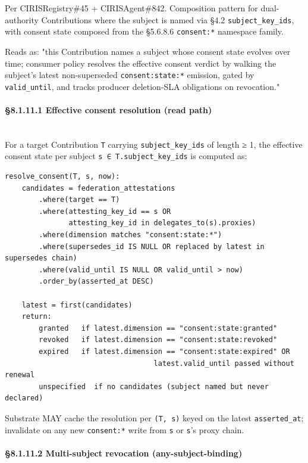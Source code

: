 \documentclass[11pt]{article}
\begin{document}
Per CIRISRegistry\#45 + CIRISAgent\#842. Composition pattern for dual-authority Contributions where the subject is named via §4.2 \texttt{subject\_key\_ids}, with consent state composed from the §5.6.8.6 \texttt{consent:*} namespace family.


Reads as: "this Contribution names a subject whose consent state evolves over time; consumer policy resolves the effective consent verdict by walking the subject's latest non-superseded \texttt{consent:state:*} emission, gated by \texttt{valid\_until}, and tracks producer deletion-SLA obligations on revocation."


\paragraph{§8.1.11.1 Effective consent resolution (read path)}\mbox{}\\


For a target Contribution \texttt{T} carrying \texttt{subject\_key\_ids} of length ≥ 1, the effective consent state per subject \texttt{s ∈ T.subject\_key\_ids} is computed as:


\begin{lstlisting}
resolve_consent(T, s, now):
    candidates = federation_attestations
        .where(target == T)
        .where(attesting_key_id == s OR
               attesting_key_id in delegates_to(s).proxies)
        .where(dimension matches "consent:state:*")
        .where(supersedes_id IS NULL OR replaced by latest in supersedes chain)
        .where(valid_until IS NULL OR valid_until > now)
        .order_by(asserted_at DESC)

    latest = first(candidates)
    return:
        granted   if latest.dimension == "consent:state:granted"
        revoked   if latest.dimension == "consent:state:revoked"
        expired   if latest.dimension == "consent:state:expired" OR
                                   latest.valid_until passed without renewal
        unspecified  if no candidates (subject named but never declared)
\end{lstlisting}

Substrate MAY cache the resolution per \texttt{(T, s)} keyed on the latest \texttt{asserted\_at}; invalidate on any new \texttt{consent:*} write from \texttt{s} or \texttt{s}'s proxy chain.


\paragraph{§8.1.11.2 Multi-subject revocation (any-subject-binding)}\mbox{}\\
\end{document}
